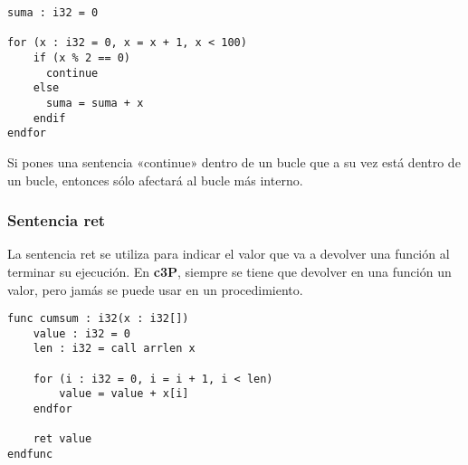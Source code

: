 \begin{verbatim}
suma : i32 = 0

for (x : i32 = 0, x = x + 1, x < 100)
    if (x % 2 == 0)
      continue
    else
      suma = suma + x
    endif
endfor
\end{verbatim}

Si pones una sentencia «continue» dentro de un bucle que a su vez
está dentro de un bucle, entonces sólo afectará al bucle más interno.

\subsubsection{Sentencia ret}

La sentencia ret se utiliza para indicar el valor que va a devolver una función al
terminar su ejecución. En \textbf{c3P}, siempre se tiene que devolver en una
función un valor, pero jamás se puede usar en un procedimiento.

\begin{verbatim}
func cumsum : i32(x : i32[])
    value : i32 = 0
    len : i32 = call arrlen x

    for (i : i32 = 0, i = i + 1, i < len)
        value = value + x[i]
    endfor

    ret value
endfunc
\end{verbatim}

